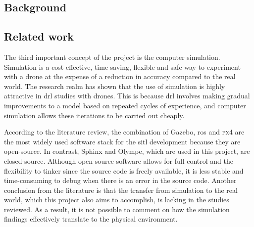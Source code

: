 \documentclass[../main.tex]{subfiles}
\begin{document}
\subsection{Background}

\blindtext

\subsection{Related work}



The third important concept of the project is the computer simulation.
Simulation is a cost-effective, time-saving, flexible 
and safe way to experiment with a drone
at the expense of a reduction in accuracy compared to the real world.
The research realm has shown that the use of simulation 
is highly attractive in \gls{drl} studies with drones.
This is because \gls{drl} involves
making gradual improvements to a model based on 
repeated cycles of experience, and computer simulation 
allows these iterations to be carried out cheaply.

According to the literature review, 
the combination of Gazebo, \gls{ros}
and \textsc{px4} are the most widely used software stack 
for the \gls{sitl} development
because they are open-source. 
In contrast, Sphinx and Olympe, which are used in this project, 
are closed-source.
Although open-source software 
allows for full control and the flexibility to tinker
since the source code is freely available,
it is less stable and time-consuming to debug
when there is an error in the source code.
Another conclusion from the literature is that 
the transfer from simulation to the real world,
which this project also aims to accomplish,
is lacking in the studies reviewed.
As a result, it is not possible to comment on 
how the simulation findings effectively translate
to the physical environment.
\end{document}

